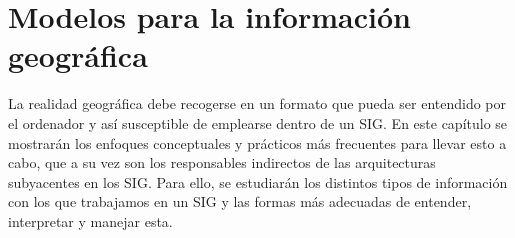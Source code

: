 
\chapter{Modelos para la información geográfica}
\label{Tipos_datos}


\bigskip

\begin{intro}
La realidad geográfica debe recogerse en un formato que pueda ser entendido por el ordenador y así susceptible de emplearse dentro de un SIG. En este capítulo se mostrarán los enfoques conceptuales y prácticos más frecuentes para llevar esto a cabo, que a su vez son los responsables indirectos de las arquitecturas subyacentes en los SIG. Para ello, se estudiarán los distintos tipos de información con los que trabajamos en un SIG y las formas más adecuadas de entender, interpretar y manejar esta.
\end{intro}


